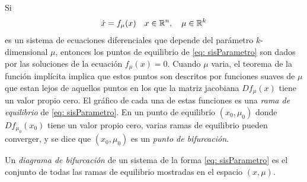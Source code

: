 Si
\begin{equation}
	\dot{x} = f_{\mu}(x) \quad x \in {\mathbb{R}}^{n}, \quad \mu \in {\mathbb{R}}^{k}
	\label{eq: sisParametro}
\end{equation}
es un sistema de ecuaciones diferenciales que depende del parámetro $k$-dimensional $\mu$, entonces los puntos de equilibrio de \eqref{eq: sisParametro} son dados por las soluciones de la ecuación $f_{\mu}(x) = 0$. Cuando $\mu$ varia, el teorema de la función implícita implica que estos puntos son descritos por funciones suaves de $\mu$ que estan lejos de aquellos puntos en los que la matriz jacobiana $Df_{\mu}(x)$ tiene un valor propio cero. El gráfico de cada una de estas funciones es una \textit{rama de equilibrio} de \eqref{eq: sisParametro}. En un punto de equilibrio $(x_{0}, \mu_{0})$ donde $Df_{\mu_{0}}(x_{0})$ tiene un valor propio cero, varias ramas de equilibrio pueden converger, y se dice que $(x_{0}, \mu_{0})$ es un \textit{punto de bifurcación}.

Un \textit{diagrama de bifurcación} de un sistema de la forma \eqref{eq: sisParametro} es el conjunto de todas las ramas de equilibrio mostradas en el espacio $(x, \mu)$.